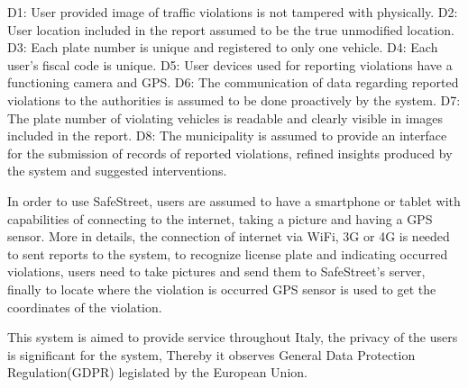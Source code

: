 D1: User provided image of traffic violations is not tampered with physically.
D2: User location included in the report assumed to be the true unmodified location.
D3: Each plate number is unique and registered to only one vehicle.
D4: Each user’s fiscal code is unique.
D5: User devices used for reporting violations have a functioning camera and GPS.
D6: The communication of data regarding reported violations to the authorities is assumed to be done proactively by the system.
D7: The plate number of violating vehicles is readable and clearly visible in images included in the report.
D8: The municipality is assumed to provide an interface for the submission of records of reported violations, refined insights produced by the system and suggested interventions.

In order to use SafeStreet, users are assumed to have a smartphone or tablet with capabilities of connecting to the internet, taking a picture and having a GPS sensor. More in details, the connection of internet via WiFi, 3G or 4G is needed to sent reports to the system, to recognize license plate and indicating occurred violations, users need to take pictures and send them to SafeStreet's server, finally to locate where the violation is occurred GPS sensor is used to get the coordinates of the violation.

This system is aimed to provide service throughout Italy, the privacy of the users is significant for the system, Thereby it observes General Data Protection Regulation(GDPR) legislated by the European Union.

